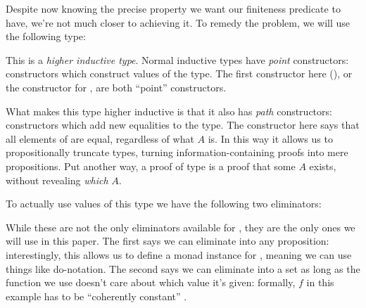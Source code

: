 Despite now knowing the precise property we want our finiteness predicate to
have, we're not much closer to achieving it.
To remedy the problem, we will use the following type:
\begin{agdalisting} \label{prop-trunc}
\end{agdalisting}
This is a \emph{higher inductive type}.
Normal inductive types have \emph{point} constructors: constructors which
construct values of the type.
The first constructor here (\AgdaInductiveConstructor{\ensuremath{\lvert \_
    \rvert}}), or the constructor  for
, are both ``point'' constructors.

What makes this type higher inductive is that it also has \emph{path}
constructors: constructors which add new equalities to the type. 
The  constructor here says that all elements of
are equal, regardless of what \(A\) is.
In this way it allows us to propositionally truncate types, turning
information-containing proofs into mere propositions.
Put another way, a proof of type 
is a proof that some \(A\) exists, without revealing \emph{which} \(A\).

To actually use values of this type we have the following two eliminators:
\begin{multicols}{2} \null \vfill
  \begin{agdalisting} \label{elim-prop}
  \end{agdalisting} \vfill \null \columnbreak \null \vfill
  \begin{agdalisting} \label{elim-prop-coh}
  \end{agdalisting} \vfill \null
\end{multicols} \noindent
While these are not the only eliminators available for , they are
the only ones we will use in this paper.
The first says we can eliminate into any proposition: interestingly, this allows
us to define a monad instance for \AgdaDatatype{\(\lVert \_ \rVert\)}, meaning
we can use things like do-notation.
The second says we can eliminate into a set as long as the function we use
doesn't care about which value it's given: formally, \(f\) in this example has
to be ``coherently constant'' \cite{krausGeneralUniversalProperty2015}.

